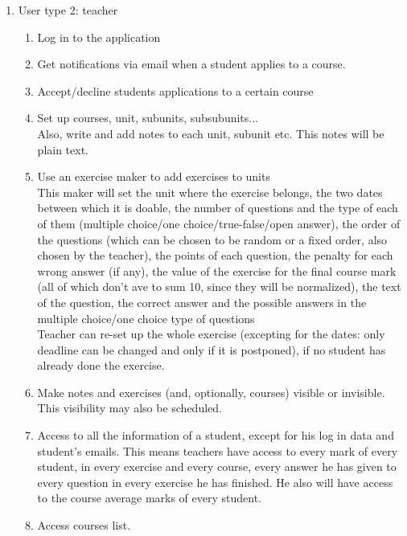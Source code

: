 \documentclass{article}
\begin{document}
\begin{enumerate}
\begin{enumerate}
\begin{enumerate}
\begin{enumerate}
			\end{enumerate}
			\item User type 2: teacher
			\begin{enumerate}
				\item Log in to the application\\
				\item Get notifications via email when a student applies to a course.\\
				\item Accept/decline students applications to a certain course\\
				\item Set up courses, unit, subunits, subsubunits...\\
				Also, write and add  notes to each unit, subunit etc. This notes will be plain text.\\
				\item Use an exercise maker to add exercises to units\\
				This maker will set the unit where the exercise belongs, the two dates between which it is doable, the number of questions and the type of each of them (multiple choice/one choice/true-false/open answer), the order of the questions (which can be chosen to be random or a fixed order, also chosen by the teacher), the points of each question, the penalty for each wrong answer (if any), the value of the exercise for the final course mark (all of which don't ave to sum 10, since they will be normalized), the text of the question, the correct answer and the possible answers in the multiple choice/one choice type of questions\\
				Teacher can re-set up the whole exercise (excepting for the dates: only deadline can be changed and only if it is postponed), if no student has already done the exercise.\\
				\item Make notes and exercises (and, optionally, courses) visible or invisible. This visibility may also be scheduled.\\
				\item Access to all the information of a student, except for his log in data and student's emails. This means teachers have access to every mark of every student, in every exercise and every course, every answer he has given to every question in every exercise he has finished. He also will have access to the course average marks of every student.\\
				\item Access courses list.\\

\end{enumerate}
\end{enumerate}
\end{enumerate}
\end{enumerate}
\end{document}
